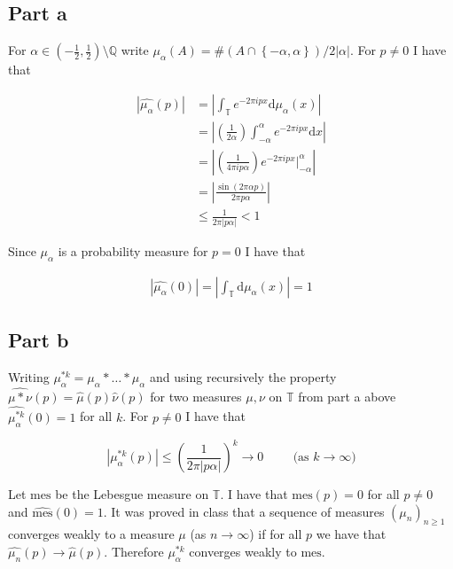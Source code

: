 \documentclass{article}
\begin{document}
\subsection*{Part a}

For $\alpha \in \left ( -\frac{1}{2}, \frac{1}{2} \right ) \setminus \mathbb{Q} $ write $\mu_\alpha \left ( A \right ) = \# \left ( A \cap \left \{ -\alpha, \alpha \right \} \right ) / 2 | \alpha |$. For $p \neq 0$ I have that

\begin{align}
	\left | \widehat{\mu_\alpha} \left ( p \right ) \right | & = \left | \int_\mathbb{T} e^{-2 \pi i p x} \mathrm{d} \mu_\alpha \left ( x \right ) \right | \\ 
	& = \left | \left ( \frac{1}{2 \alpha} \right ) \int_{-\alpha}^\alpha e^{-2 \pi i p x} \mathrm{d} x \right | \\ 
	& = \left |\left ( \frac{1}{4 \pi i p \alpha} \right ) e^{-2 \pi i p x} \Bigr|_{-\alpha}^\alpha \right | \\ 
	& = \left | \frac{\sin \left ( 2 \pi \alpha p \right )}{2 \pi p \alpha} \right | \\ 
	& \leq \frac{1}{2 \pi \left | p \alpha \right |} < 1 
\end{align}

Since $\mu_\alpha$ is a probability measure for $p = 0$ I have that

\begin{align}
	\left | \widehat{\mu_\alpha} \left ( 0 \right ) \right | = \left | \int_\mathbb{T} \mathrm{d} \mu_\alpha \left ( x \right ) \right | = 1 
\end{align}

\subsection*{Part b}

Writing $\mu_\alpha^{\ast k} = \mu_\alpha \ast \dots \ast \mu_\alpha$ and using recursively the property $\widehat{\mu \ast \nu} \left ( p \right ) = \widehat{\mu} \left ( p \right ) \widehat{\nu} \left ( p \right )$ for two measures $\mu, \nu$ on $\mathbb{T}$ from part a above $\widehat{\mu_\alpha^{\ast k}} \left ( 0 \right ) = 1$ for all $k$. For $p \neq 0$ I have that

\begin{equation}
	\left | \mu_\alpha^{\ast k} \left ( p \right ) \right | \leq \left ( \frac{1}{2 \pi \left | p \alpha \right |} \right ) ^ k \rightarrow 0 \hspace{1cm} \text{(as $k \rightarrow \infty$)}
\end{equation}

Let $\text{mes}$ be the Lebesgue measure on $\mathbb{T}$. I have that $\widehat{\text{mes}} \left ( p \right ) = 0$ for all $p \neq 0$ and $\widehat{\text{mes}} \left ( 0 \right ) = 1$. It was proved in class that a sequence of measures $\left ( \mu_n \right )_{n \geq 1}$ converges weakly to a measure $\mu$ (as $n \rightarrow \infty$) if for all $p$ we have that $\widehat{\mu_n} \left ( p \right ) \rightarrow \widehat{\mu} \left ( p \right ) $. Therefore $\mu_\alpha^{\ast k}$ converges weakly to $\text{mes}$. 
\end{document}
